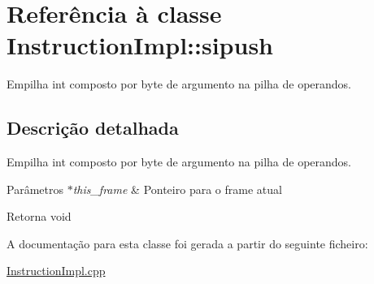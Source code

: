 \hypertarget{class_instruction_impl_1_1sipush}{}\section{Referência à classe Instruction\+Impl\+:\+:sipush}
\label{class_instruction_impl_1_1sipush}


Empilha int composto por byte de argumento na pilha de operandos.  




\subsection{Descrição detalhada}
Empilha int composto por byte de argumento na pilha de operandos. 


\begin{DoxyParams}{Parâmetros}
{\em $\ast$this\+\_\+frame} & Ponteiro para o frame atual \\
\hline
\end{DoxyParams}
\begin{DoxyReturn}{Retorna}
void 
\end{DoxyReturn}


A documentação para esta classe foi gerada a partir do seguinte ficheiro\+:\begin{DoxyCompactItemize}
\item 
\hyperlink{_instruction_impl_8cpp}{Instruction\+Impl.\+cpp}\end{DoxyCompactItemize}
